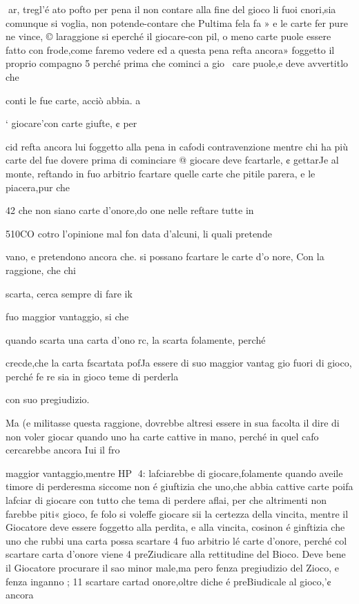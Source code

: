 \documentclass[12pt,a6paper]{article}
\begin{document}
 
ar,
tregl’é ato pofto per pena il
non contare alla fine del gioco
li fuoi cnori,sia comunque si voglia, non potende-contare che
Pultima fela fa » e le carte fer
pure ne vince, © laraggione si
eperché il giocare-con pil, o
meno carte puole essere fatto
con frode,come faremo vedere
ed a questa pena refta ancora»
foggetto il proprio compagno 5
perché prima che cominci a gio~
care puole,e deve avvertitlo che

conti le fue carte, acciò abbia. a

‘ giocare'con carte giufte, ¢ per

cid refta ancora lui foggetto alla
pena in cafodi contravenzione
mentre chi ha più carte del fue
dovere prima di cominciare @
giocare deve fcartarle, ¢ gettarJe al monte, reftando in fuo arbitrio fcartare quelle carte che
pitile parera, e le piacera,pur
che
 

 

 

42
che non siano carte d’onore,do
one nelle reftare tutte in

510CO cotro l’opinione mal fon
data d’alcuni, li quali pretende~

vano, e pretendono ancora che.
si possano fcartare le carte d’o
nore, Con la raggione, che chi

scarta, cerca sempre di fare ik

fuo maggior vantaggio, si che

quando scarta una carta d’ono
rc, la scarta folamente, perché

crecde,che la carta fscartata pofJa essere di suo maggior vantag
gio fuori di gioco, perché fe re
sia in gioco teme di perderla

con suo pregiudizio.

Ma (e militasse questa raggione, dovrebbe altresi essere in
sua facolta il dire di non voler
giocar quando uno ha carte cattive in mano, perché in quel cafo cercarebbe ancora Iui il fro

maggior vantaggio,mentre HP
4:
lafciarebbe di giocare,folamente quando aveile timore di perderesma siccome non é giuftizia
che uno,che abbia cattive carte
poifa lafciar di giocare con tutto che tema di perdere aflai, per
che altrimenti non farebbe piti«
gioco, fe folo si voleffe giocare
sii la certezza della vincita,
mentre il Giocatore deve essere foggetto alla perdita, e alla vincita, cosinon é ginftizia
che uno che rubbi una carta
possa scartare 4 fuo arbitrio lé
carte d’onore, perché col scartare carta d’onore viene 4 preZiudicare alla rettitudine del
Bioco. Deve bene il Giocatore
procurare il sao minor male,ma
pero fenza pregiudizio del Zioco, e fenza inganno ; 11 scartare
cartad onore,oltre diche é preBiudicale al gioco,'¢ ancora
\end{document}
